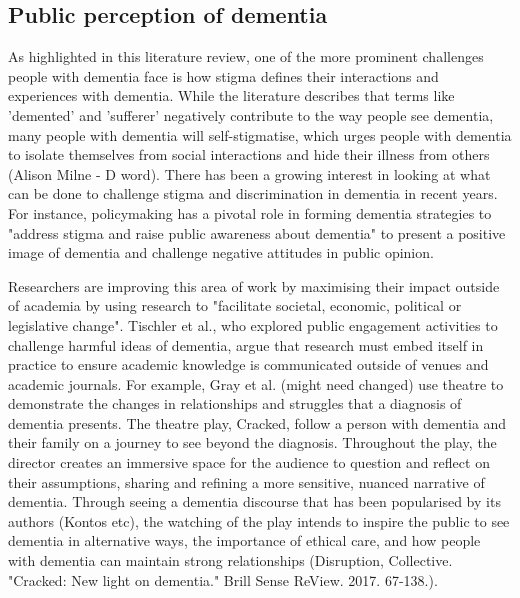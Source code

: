 \subsection{Public perception of dementia}
\label{BL:PublicPerception}
As highlighted in this literature review, one of the more prominent challenges people with dementia face is how stigma defines their interactions and experiences with dementia. While the literature describes that terms like 'demented' and 'sufferer' negatively contribute to the way people see dementia, many people with dementia will self-stigmatise, which urges people with dementia to isolate themselves from social interactions and hide their illness from others (Alison Milne - D word). There has been a growing interest in looking at what can be done to challenge stigma and discrimination in dementia in recent years. For instance, policymaking has a pivotal role in forming dementia strategies to "address stigma and raise public awareness about dementia" to present a positive image of dementia and challenge negative attitudes in public opinion. 

Researchers are improving this area of work by maximising their impact outside of academia by using research to "facilitate societal, economic, political or legislative change". Tischler et al., who explored public engagement activities to challenge harmful ideas of dementia, argue that research must embed itself in practice to ensure academic knowledge is communicated outside of venues and academic journals. For example, Gray et al. (might need changed) use theatre to demonstrate the changes in relationships and struggles that a diagnosis of dementia presents. The theatre play, Cracked, follow a person with dementia and their family on a journey to see beyond the diagnosis. Throughout the play, the director creates an immersive space for the audience to question and reflect on their assumptions, sharing and refining a more sensitive, nuanced narrative of dementia. Through seeing a dementia discourse that has been popularised by its authors (Kontos etc), the watching of the play intends to inspire the public to see dementia in alternative ways, the importance of ethical care, and how people with dementia can maintain strong relationships (Disruption, Collective. "Cracked: New light on dementia." Brill Sense ReView. 2017. 67-138.).

